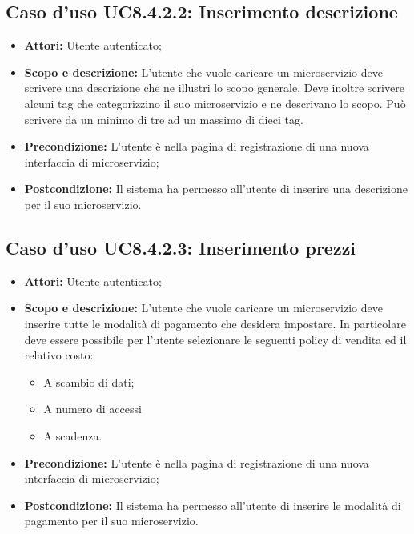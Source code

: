 \documentclass[12pt,a4paper,titlepage]{article}
\begin{document}
	\subsection{Caso d'uso UC8.4.2.2: Inserimento descrizione}
	\label{UC8.4.2.2}
	\begin{itemize}
		\item \textbf{Attori: }Utente autenticato;
		\item \textbf{Scopo e descrizione: }L'utente che vuole caricare un microservizio deve scrivere una descrizione che ne illustri lo scopo generale. Deve inoltre scrivere alcuni tag che categorizzino il suo microservizio e ne descrivano lo scopo. Può scrivere da un minimo di tre ad un massimo di dieci tag.
		\item \textbf{Precondizione: }L'utente è nella pagina di registrazione di una nuova interfaccia di microservizio;
		\item \textbf{Postcondizione: }Il sistema ha permesso all'utente di inserire una descrizione per il suo microservizio.
	\end{itemize}
	\subsection{Caso d'uso UC8.4.2.3: Inserimento prezzi}
	\label{UC8.4.2.3}
	\begin{itemize}
		\item \textbf{Attori: }Utente autenticato;
		\item \textbf{Scopo e descrizione: }L'utente che vuole caricare un microservizio deve inserire tutte le modalità di pagamento che desidera impostare. In particolare deve essere possibile per l'utente selezionare le seguenti policy di vendita ed il relativo costo:
		\begin{itemize}
			\item A scambio di dati;
			\item A numero di accessi
			\item A scadenza.
		\end{itemize} 
		\item \textbf{Precondizione: }L'utente è nella pagina di registrazione di una nuova interfaccia di microservizio;
		\item \textbf{Postcondizione: }Il sistema ha permesso all'utente di inserire le modalità di pagamento per il suo microservizio.
	\end{itemize}
\end{document}
